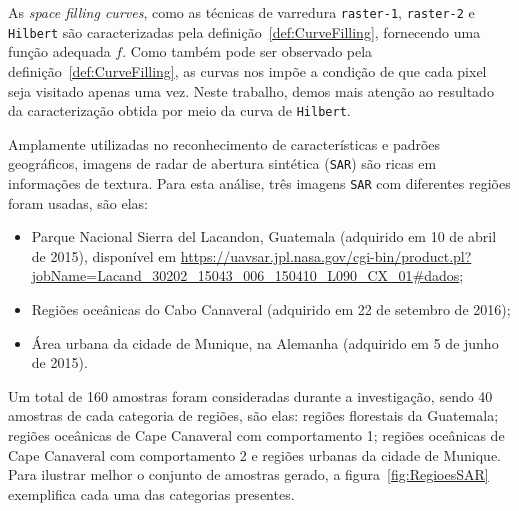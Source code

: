 \documentclass[12pt]{article}
\begin{document}
As \textit{space filling curves}, como as técnicas de varredura \texttt{raster-1}, \texttt{raster-2} e \texttt{Hilbert} são caracterizadas pela definição~\ref{def:CurveFilling}, fornecendo uma função adequada $f$. 
Como também pode ser observado pela definição~\ref{def:CurveFilling}, as curvas nos impõe a condição de que cada pixel seja visitado apenas uma vez.
Neste trabalho, demos mais atenção ao resultado da caracterização obtida por meio da curva de \texttt{Hilbert}. 


Amplamente utilizadas no reconhecimento de características e padrões geográficos, imagens de radar de abertura sintética (\texttt{SAR}) são ricas em informações de textura. Para esta análise, três imagens \texttt{SAR} com diferentes regiões foram usadas, são elas:

\begin{itemize}
    \item Parque Nacional Sierra del Lacandon, Guatemala (adquirido em 10 de abril de 2015), disponível em \url{https://uavsar.jpl.nasa.gov/cgi-bin/product.pl?jobName=Lacand_30202_15043_006_150410_L090_CX_01#dados};
    \item Regiões oceânicas do Cabo Canaveral (adquirido em 22 de setembro de 2016);
    \item Área urbana da cidade de Munique, na Alemanha (adquirido em 5 de junho de 2015).
\end{itemize}

Um total de 160 amostras foram consideradas durante a investigação, sendo 40 amostras de cada categoria de regiões, são elas: regiões florestais da Guatemala; regiões oceânicas de Cape Canaveral com comportamento 1; regiões oceânicas de Cape Canaveral com comportamento 2 e regiões urbanas da cidade de Munique. Para ilustrar melhor o conjunto de amostras gerado, a figura~\ref{fig:RegioesSAR} exemplifica cada uma das categorias presentes.
\end{document}
